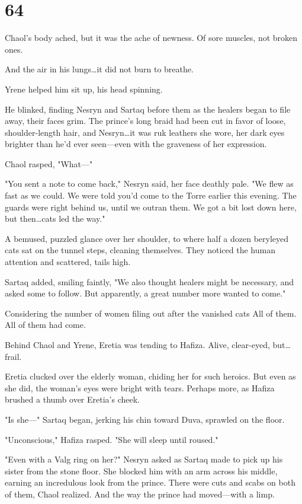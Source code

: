 
\chapter{64}

Chaol's body ached, but it was the ache of newness.
Of sore muscles, not broken ones.

And the air in his lungs\ldots it did not burn to breathe.

Yrene helped him sit up, his head spinning.

He blinked, finding Nesryn and Sartaq before them as the healers began to file away, their faces grim.
The prince's long braid had been cut in favor of loose, shoulder-length hair, and Nesryn\ldots it was ruk leathers she wore, her dark eyes brighter than he'd ever seen---even with the graveness of her expression.

Chaol rasped, "What---"

"You sent a note to come back," Nesryn said, her face deathly pale.
"We flew as fast as we could.
We were told you'd come to the Torre earlier this evening.
The guards were right behind us, until we outran them.
We got a bit lost down here, but then\ldots cats led the way."

A bemused, puzzled glance over her shoulder, to where half a dozen beryleyed cats sat on the tunnel steps, cleaning themselves.
They noticed the human attention and scattered, tails high.

Sartaq added, smiling faintly, "We also thought healers might be necessary, and asked some to follow.
But apparently, a great number more wanted to come."

Considering the number of women filing out after the vanished cats  All of them.
All of them had come.

Behind Chaol and Yrene, Eretia was tending to Hafiza.
Alive, clear-eyed, but\ldots frail.

Eretia clucked over the elderly woman, chiding her for such heroics.
But even as she did, the woman's eyes were bright with tears.
Perhaps more, as Hafiza brushed a thumb over Eretia's cheek.

"Is she---" Sartaq began, jerking his chin toward Duva, sprawled on the floor.

"Unconscious," Hafiza rasped.
"She will sleep until roused."

"Even with a Valg ring on her?"
Nesryn asked as Sartaq made to pick up his sister from the stone floor.
She blocked him with an arm across his middle, earning an incredulous look from the prince.
There were cuts and scabs on both of them, Chaol realized.
And the way the prince had moved---with a limp.

